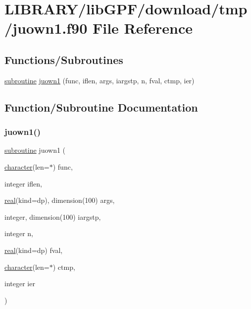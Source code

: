 \hypertarget{juown1_8f90}{}\section{L\+I\+B\+R\+A\+R\+Y/lib\+G\+P\+F/download/tmp/juown1.f90 File Reference}
\label{juown1_8f90}
\subsection*{Functions/\+Subroutines}
\begin{DoxyCompactItemize}
\item 
\hyperlink{M__stopwatch_83_8txt_acfbcff50169d691ff02d4a123ed70482}{subroutine} \hyperlink{juown1_8f90_a313c897cec3139ac9722b8f907c86495}{juown1} (func, iflen, args, iargstp, n, fval, ctmp, ier)
\end{DoxyCompactItemize}


\subsection{Function/\+Subroutine Documentation}
\mbox{\label{juown1_8f90_a313c897cec3139ac9722b8f907c86495}} 
\subsubsection{\texorpdfstring{juown1()}{juown1()}}
{\footnotesize\ttfamily \hyperlink{M__stopwatch_83_8txt_acfbcff50169d691ff02d4a123ed70482}{subroutine} juown1 (\begin{DoxyParamCaption}\item[{\hyperlink{option__stopwatch_83_8txt_abd4b21fbbd175834027b5224bfe97e66}{character}(len=$\ast$)}]{func,  }\item[{integer}]{iflen,  }\item[{\hyperlink{read__watch_83_8txt_abdb62bde002f38ef75f810d3a905a823}{real}(kind=dp), dimension(100)}]{args,  }\item[{integer, dimension(100)}]{iargstp,  }\item[{integer}]{n,  }\item[{\hyperlink{read__watch_83_8txt_abdb62bde002f38ef75f810d3a905a823}{real}(kind=dp)}]{fval,  }\item[{\hyperlink{option__stopwatch_83_8txt_abd4b21fbbd175834027b5224bfe97e66}{character}(len=$\ast$)}]{ctmp,  }\item[{integer}]{ier }\end{DoxyParamCaption})}

